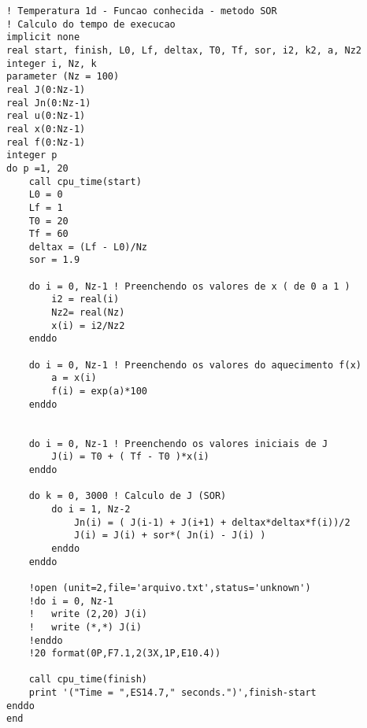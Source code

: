 \lstset{language=Fortran}
\begin{lstlisting}
! Temperatura 1d - Funcao conhecida - metodo SOR 
! Calculo do tempo de execucao
implicit none
real start, finish, L0, Lf, deltax, T0, Tf, sor, i2, k2, a, Nz2
integer i, Nz, k
parameter (Nz = 100)
real J(0:Nz-1)
real Jn(0:Nz-1)
real u(0:Nz-1)
real x(0:Nz-1)
real f(0:Nz-1)
integer p
do p =1, 20
	call cpu_time(start)
	L0 = 0
	Lf = 1
	T0 = 20
	Tf = 60
	deltax = (Lf - L0)/Nz 
	sor = 1.9

	do i = 0, Nz-1 ! Preenchendo os valores de x ( de 0 a 1 )
		i2 = real(i)
		Nz2= real(Nz)
		x(i) = i2/Nz2
	enddo

	do i = 0, Nz-1 ! Preenchendo os valores do aquecimento f(x)
		a = x(i)
		f(i) = exp(a)*100
	enddo


	do i = 0, Nz-1 ! Preenchendo os valores iniciais de J 
		J(i) = T0 + ( Tf - T0 )*x(i)
	enddo

	do k = 0, 3000 ! Calculo de J (SOR)
		do i = 1, Nz-2
			Jn(i) = ( J(i-1) + J(i+1) + deltax*deltax*f(i))/2
			J(i) = J(i) + sor*( Jn(i) - J(i) )	
		enddo
	enddo

	!open (unit=2,file='arquivo.txt',status='unknown')	
	!do i = 0, Nz-1
	!	write (2,20) J(i)
	!	write (*,*) J(i)
	!enddo
	!20	format(0P,F7.1,2(3X,1P,E10.4))

	call cpu_time(finish)
	print '("Time = ",ES14.7," seconds.")',finish-start
enddo
end 
\end{lstlisting}